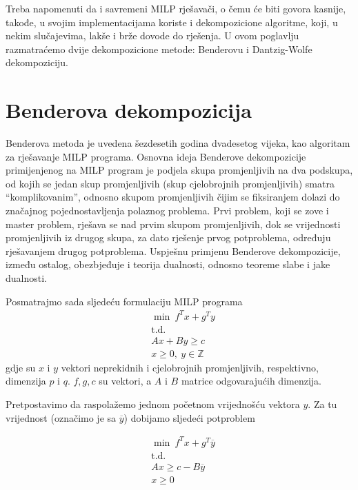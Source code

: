 \documentclass[a4paper, utf8, 11pt, colorlinks]{book}
\theoremstyle{definition}
\begin{document}
Treba napomenuti da i savremeni MILP rješavači, o čemu će biti govora kasnije, takođe, u svojim implementacijama koriste i dekompozicione algoritme, koji, u nekim slučajevima, lakše i brže dovode do rješenja. U ovom poglavlju razmatraćemo dvije dekompozicione metode: Benderovu i Dantzig-Wolfe dekompoziciju.
 
 \section{Benderova dekompozicija}
 
 Benderova metoda je uvedena šezdesetih godina dvadesetog vijeka, kao algoritam za rješavanje MILP programa. 
 Osnovna ideja Benderove dekompozicije primijenjenog na MILP program je podjela skupa promjenljivih na dva podskupa, od kojih se jedan skup promjenljivih (skup cjelobrojnih promjenljivih) smatra ``komplikovanim'', odnosno skupom promjenljivih čijim se fiksiranjem dolazi do značajnog pojednostavljenja polaznog problema. Prvi problem, koji se zove i master problem,  rješava se nad prvim skupom promjenljivih, dok se vrijednosti promjenljivih iz drugog skupa,  za dato rješenje prvog potproblema, određuju rješavanjem drugog potproblema. Uspješnu primjenu Benderove dekompozicije, između ostalog, obezbjeđuje i teorija dualnosti, odnosno teoreme slabe i jake dualnosti.
 

 Posmatrajmo sada sljedeću formulaciju MILP programa
\begin{equation}
 \begin{aligned}\label{bender1}
  &\min\  f^Tx+g^Ty\\
 & \mbox{t.d.}\\
  &Ax+By\geqslant c\\
 &x\geqslant 0,\ y \in \mathbb{Z}
 \end{aligned}
\end{equation}
 gdje su $x$ i $y$ vektori neprekidnih i cjelobrojnih promjenljivih, respektivno, dimenzija $p$ i $q$. $f,g,c$ su vektori, a $A$ i $B$ matrice odgovarajućih dimenzija. 
 
 Pretpostavimo da raspolažemo jednom početnom vrijednošću vektora $y$. Za tu vrijednost (označimo je sa $\overline{y}$) dobijamo sljedeći potproblem

\begin{equation}
	\begin{aligned}\label{bender2}
 			&\min\  f^Tx+g^T\overline{y}\\
 		& \mbox{t.d.}\\
 		& Ax\geqslant c-B\overline{y}\\
 		& x\geqslant 0
 \end{aligned}
\end{equation}
\end{document}
